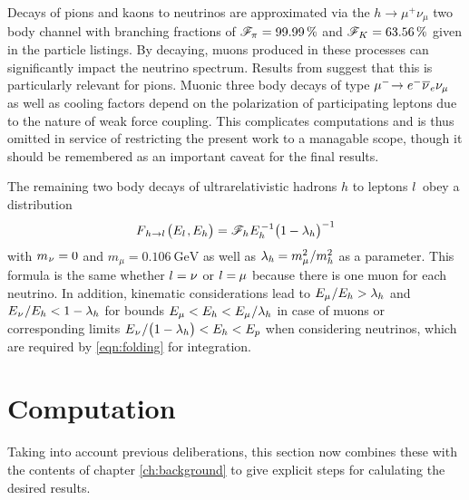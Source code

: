 Decays of pions and kaons to neutrinos are approximated via the $h \rightarrow \mu^+ \nu_\mu$ two body channel with branching
fractions of $\mathscr{F}_{\kern-0.2pt \pi \kern+0.2pt} = \qty{99.99}{\percent}$ and
$\mathscr{F}_{\kern+0.3pt K \kern+0.2pt} = \qty{63.56}{\percent}$ given in the \cite{pdg}
particle listings. By decaying, muons produced in these processes can significantly impact the neutrino spectrum. Results from
\cite{Carpio_2020} suggest that this is particularly relevant for pions. Muonic three body decays of type
$\mu^- \kern-2.5pt \kern+0.5pt \rightarrow e^- \kern+0.5pt \overline{\kern-0.2pt \nu \kern+0.8pt}_e \nu_\mu$ as well as
cooling factors depend on the polarization of participating leptons due to the nature of weak force coupling. This complicates
computations and is thus omitted in service of restricting the present work to a managable scope, though it should be remembered
as an important caveat for the final results.

The remaining two body decays of ultrarelativistic hadrons $h$ to leptons $l \kern+1.0pt$ obey a distribution
\begin{equation*}
	F_{\kern+1.0pt h \kern+0.2pt \rightarrow l \kern+1.0pt} \bigl( E_l \kern+0.8pt, \kern-0.2pt E_h \bigr) =
	\mathscr{F}_{\kern+0.2pt h \kern+0.2pt} E_h^{\kern+1.0pt -1} \bigl( 1 \kern-0.3pt - \lambda_h \bigr)^{-1}
\end{equation*}
with $m_{\kern+0.5pt \nu} = 0$ and $m_\mu = \qty{0.106}{\giga\electronvolt}$ \cite{pdg} as well as
$\lambda_h \kern-0.3pt = m_\mu^2 \kern+0.5pt / m_h^2$ as a parameter. This formula is the same whether
$l = \nu \kern+0.2pt$ or $l = \kern-0.3pt \mu$ because there is one muon for each neutrino. In addition,
kinematic considerations lead to $E_\mu \kern+0.5pt / E_h > \lambda_h$ and
$E_{\kern+0.5pt \nu} \kern+0.5pt / E_h < 1 - \lambda_h$ for bounds
$E_\mu < E_h < E_\mu \kern+0.5pt / \lambda_h$ in case of muons or corresponding limits
$E_{\kern+0.5pt \nu} \kern+0.5pt / \smash{\bigl( 1 - \lambda_h \bigr)} < E_h < E_p$ when considering neutrinos, which are
required by \eqref{eqn:folding} for integration.



\section{Computation}
\label{sec:computation}

Taking into account previous deliberations, this section now combines these with the contents of chapter \ref{ch:background}
to give explicit steps for calulating the desired results.




